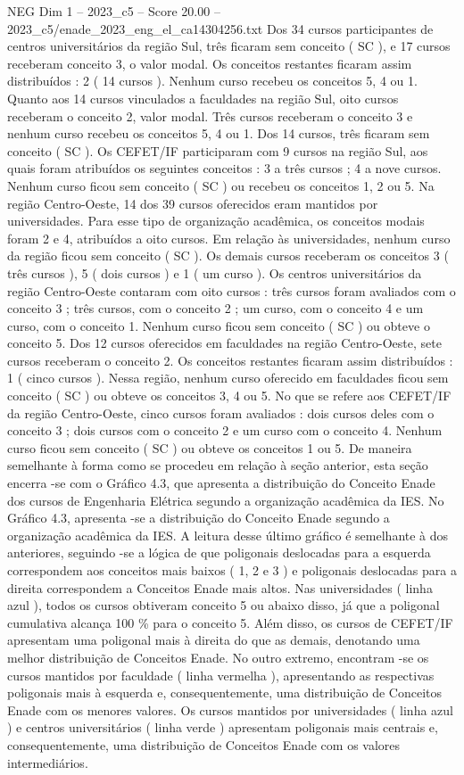 \begin{textsample}{NEG Dim 1 – 2023\_c5 – Score 20.00 – 2023\_c5/enade\_2023\_eng\_el\_ca14304256.txt}
Dos 34 cursos participantes de centros universitários da região Sul, três ficaram sem conceito ( SC ), e 17 cursos receberam conceito 3, o valor modal.
Os conceitos restantes ficaram assim distribuídos : 2 ( 14 cursos ).
Nenhum curso recebeu os conceitos 5, 4 ou 1.
Quanto aos 14 cursos vinculados a faculdades na região Sul, oito cursos receberam o conceito 2, valor modal.
Três cursos receberam o conceito 3 e nenhum curso recebeu os conceitos 5, 4 ou 1.
Dos 14 cursos, três ficaram sem conceito ( SC ).
Os CEFET/IF participaram com 9 cursos na região Sul, aos quais foram atribuídos os seguintes conceitos : 3 a três cursos ; 4 a nove cursos.
Nenhum curso ficou sem conceito ( SC ) ou recebeu os conceitos 1, 2 ou 5.
Na região Centro-Oeste, 14 dos 39 cursos oferecidos eram mantidos por universidades.
Para esse tipo de organização acadêmica, os conceitos modais foram 2 e 4, atribuídos a oito cursos.
Em relação às universidades, nenhum curso da região ficou sem conceito ( SC ).
Os demais cursos receberam os conceitos 3 ( três cursos ), 5 ( dois cursos ) e 1 ( um curso ).
Os centros universitários da região Centro-Oeste contaram com oito cursos : três cursos foram avaliados com o conceito 3 ; três cursos, com o conceito 2 ; um curso, com o conceito 4 e um curso, com o conceito 1.
Nenhum curso ficou sem conceito ( SC ) ou obteve o conceito 5.
Dos 12 cursos oferecidos em faculdades na região Centro-Oeste, sete cursos receberam o conceito 2.
Os conceitos restantes ficaram assim distribuídos : 1 ( cinco cursos ).
Nessa região, nenhum curso oferecido em faculdades ficou sem conceito ( SC ) ou obteve os conceitos 3, 4 ou 5.
No que se refere aos CEFET/IF da região Centro-Oeste, cinco cursos foram avaliados : dois cursos deles com o conceito 3 ; dois cursos com o conceito 2 e um curso com o conceito 4.
Nenhum curso ficou sem conceito ( SC ) ou obteve os conceitos 1 ou 5.
De maneira semelhante à forma como se procedeu em relação à seção anterior, esta seção encerra -se com o Gráfico 4.3, que apresenta a distribuição do Conceito Enade dos cursos de Engenharia Elétrica segundo a organização acadêmica da IES.
No Gráfico 4.3, apresenta -se a distribuição do Conceito Enade segundo a organização acadêmica da IES.
A leitura desse último gráfico é semelhante à dos anteriores, seguindo -se a lógica de que poligonais deslocadas para a esquerda correspondem aos conceitos mais baixos ( 1, 2 e 3 ) e poligonais deslocadas para a direita correspondem a Conceitos Enade mais altos.
Nas universidades ( linha azul ), todos os cursos obtiveram conceito 5 ou abaixo disso, já que a poligonal cumulativa alcança 100 \% para o conceito 5.
Além disso, os cursos de CEFET/IF apresentam uma poligonal mais à direita do que as demais, denotando uma melhor distribuição de Conceitos Enade.
No outro extremo, encontram -se os cursos mantidos por faculdade ( linha vermelha ), apresentando as respectivas poligonais mais à esquerda e, consequentemente, uma distribuição de Conceitos Enade com os menores valores.
Os cursos mantidos por universidades ( linha azul ) e centros universitários ( linha verde ) apresentam poligonais mais centrais e, consequentemente, uma distribuição de Conceitos Enade com os valores intermediários.

\end{textsample}
